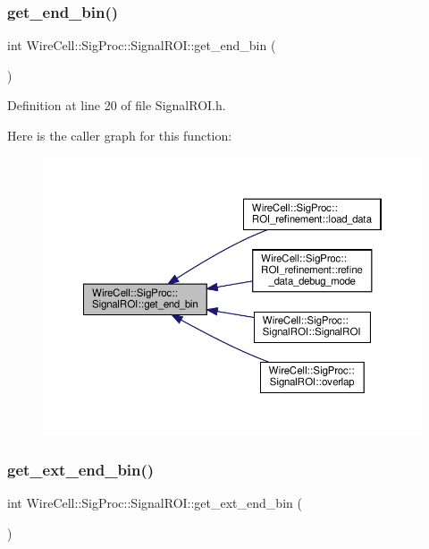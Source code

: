 \subsubsection{\texorpdfstring{get\+\_\+end\+\_\+bin()}{get\_end\_bin()}}
{\footnotesize\ttfamily int Wire\+Cell\+::\+Sig\+Proc\+::\+Signal\+R\+O\+I\+::get\+\_\+end\+\_\+bin (\begin{DoxyParamCaption}{ }\end{DoxyParamCaption})\hspace{0.3cm}{\ttfamily [inline]}}



Definition at line 20 of file Signal\+R\+O\+I.\+h.

Here is the caller graph for this function\+:
\nopagebreak
\begin{figure}[H]
\begin{center}
\leavevmode
\includegraphics[width=350pt]{class_wire_cell_1_1_sig_proc_1_1_signal_r_o_i_a826112ffb7fed5ffeff403e4a34c036c_icgraph}
\end{center}
\end{figure}
\mbox{\label{class_wire_cell_1_1_sig_proc_1_1_signal_r_o_i_a5d660871a8da8908e8ee1e1ed99a7ce7}} 
\subsubsection{\texorpdfstring{get\+\_\+ext\+\_\+end\+\_\+bin()}{get\_ext\_end\_bin()}}
{\footnotesize\ttfamily int Wire\+Cell\+::\+Sig\+Proc\+::\+Signal\+R\+O\+I\+::get\+\_\+ext\+\_\+end\+\_\+bin (\begin{DoxyParamCaption}{ }\end{DoxyParamCaption})\hspace{0.3cm}{\ttfamily [inline]}}



